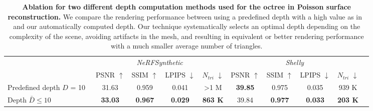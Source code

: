 \begin{table}
   \caption{
   \textbf{Ablation for two different depth computation methods used for the octree in Poisson surface reconstruction.} We compare the rendering performance between using a predefined depth with a high value as in~\cite{guedon2023sugar} and our automatically computed depth. Our technique systematically selects an optimal depth depending on the complexity of the scene, avoiding artifacts in the mesh, and resulting in equivalent or better rendering performance with a much smaller average number of triangles.
   }
  \label{tab:ablation-octree-depth}
  \centering
  {\scriptsize
  \begin{tabular}{@{}lccccccccc@{}}
    \toprule
     \multicolumn{1}{c}{} & \multicolumn{4}{c}{\emph{NeRFSynthetic}} & \multicolumn{4}{c}{\emph{Shelly}} \\
     \cmidrule(r){2-5} \cmidrule(r){6-9}
      & PSNR $\uparrow$ & SSIM $\uparrow$ & LPIPS $\downarrow$ & $N_{tri}$ $\downarrow$  & PSNR $\uparrow$ & SSIM $\uparrow$ & LPIPS $\downarrow$ & $N_{tri}$ $\downarrow$ & \\
    \midrule
    Predefined depth $D$ = 10~\cite{guedon2023sugar} & 31.63 & 0.959 & 0.041 & >1 M & \cellcolor{red!25}\textbf{39.85} & 0.975 & 0.035 & 939 K &\\
    Depth $\bar{D} \leq 10$ & \cellcolor{red!25}\textbf{33.03} & \cellcolor{red!25}\textbf{0.967} & \cellcolor{red!25}\textbf{0.029} & \cellcolor{red!25}\textbf{863 K} & 39.84 & \cellcolor{red!25}\textbf{0.977} & \cellcolor{red!25}\textbf{0.033} & \cellcolor{red!25}\textbf{203 K} &\\
    \bottomrule
  \end{tabular}
  }
\end{table}